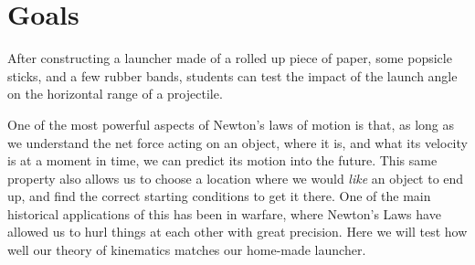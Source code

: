 \renewcommand\thechapter{c1.6a}
\label{lab:ProjectileMotion}

\apparatus
{}

\section*{Goals}

After constructing a launcher made of a rolled up piece of paper, some popsicle sticks, and a few rubber bands, students can test the impact of the launch angle on the horizontal range of a projectile.

\introduction

One of the most powerful aspects of Newton's laws of motion is that, as long as we understand the net force acting on an object, where it is, and what its velocity is at a moment in time, we can predict its motion into the future. This same property also allows us to choose a location where we would \emph{like} an object to end up, and find the correct starting conditions to get it there.  One of the main historical applications of this has been in warfare, where Newton's Laws have allowed us to hurl things at each other with great precision.  Here we will test how well our theory of kinematics matches our home-made launcher.

\observations


